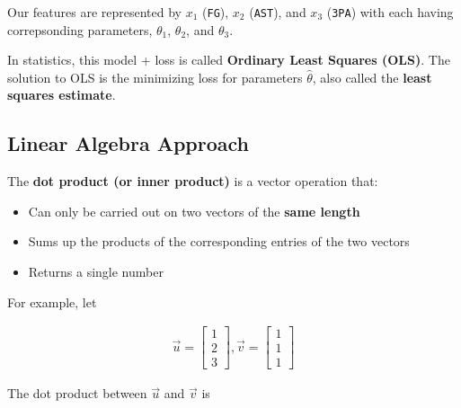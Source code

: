 \documentclass[
  letterpaper,
  DIV=11,
  numbers=noendperiod]{scrreprt}
\providecommand{\tightlist}{%
  \setlength{\itemsep}{0pt}\setlength{\parskip}{0pt}}\usepackage{longtable,booktabs,array}
\begin{document}
Our features are represented by \(x_1\) (\texttt{FG}), \(x_2\)
(\texttt{AST}), and \(x_3\) (\texttt{3PA}) with each having
correpsonding parameters, \(\theta_1\), \(\theta_2\), and \(\theta_3\).

In statistics, this model + loss is called \textbf{Ordinary Least
Squares (OLS)}. The solution to OLS is the minimizing loss for
parameters \(\hat{\theta}\), also called the \textbf{least squares
estimate}.

\subsection{Linear Algebra Approach}\label{linear-algebra-approach}

\begin{tcolorbox}[enhanced jigsaw, titlerule=0mm, bottomtitle=1mm, arc=.35mm, colframe=quarto-callout-tip-color-frame, rightrule=.15mm, opacityback=0, opacitybacktitle=0.6, leftrule=.75mm, breakable, toprule=.15mm, colback=white, left=2mm, colbacktitle=quarto-callout-tip-color!10!white, toptitle=1mm, bottomrule=.15mm, title=\textcolor{quarto-callout-tip-color}{\faLightbulb}\hspace{0.5em}{Linear Algebra Review: Vector Dot Product}, coltitle=black]

The \textbf{dot product (or inner product)} is a vector operation that:

\begin{itemize}
\tightlist
\item
  Can only be carried out on two vectors of the \textbf{same length}
\item
  Sums up the products of the corresponding entries of the two vectors
\item
  Returns a single number
\end{itemize}

For example, let

\begin{align}
\vec{u} = \begin{bmatrix}1 \\ 2 \\ 3\end{bmatrix}, \vec{v} = \begin{bmatrix}1 \\ 1 \\ 1\end{bmatrix}
\end{align}

The dot product between \(\vec{u}\) and \(\vec{v}\) is


\end{tcolorbox}
\end{document}
